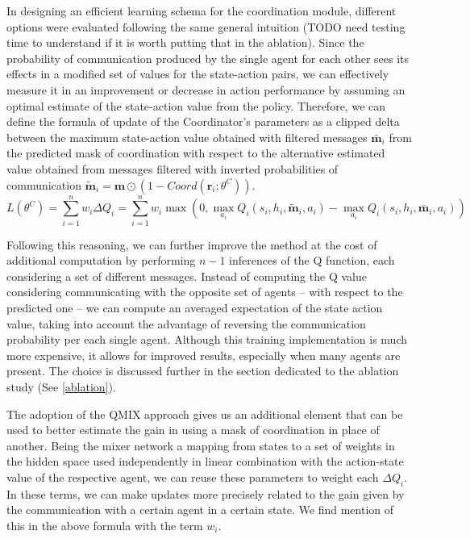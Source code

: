 \documentclass[a4paper,singleside,12pt]{report} %
\begin{document}
In designing an efficient learning schema for the coordination module, different options were evaluated following the same general intuition (TODO need testing time to understand if it is worth putting that in the ablation). Since the probability of communication produced by the single agent for each other sees its effects in a modified set of values for the state-action pairs, we can effectively measure it in an improvement or decrease in action performance by assuming an optimal estimate of the state-action value from the policy. Therefore, we can define the formula of update of the Coordinator's parameters as a clipped delta between the maximum state-action value obtained with filtered messages \(\bar{\textbf{m}}_i\) from the predicted mask of coordination with respect to the alternative estimated value obtained from messages filtered with inverted probabilities of communication
\(\tilde{\textbf{m}}_i = \textbf{m} \odot (1- Coord(\textbf{r}_i; \theta^C))\).
  \begin{equation}
    L(\theta^C)= \sum^n_{i=1} w_i \Delta Q_i = \sum^n_{i=1} w_i \max(0,\max_{a_i}Q_i(s_i,h_i,\tilde{\textbf{m}}_i,a_i) - \max_{a_i}Q_i(s_i,h_i,\bar{\textbf{m}}_i,a_i))
  \end{equation}

Following this reasoning, we can further improve the method at the cost of additional computation by performing $n-1$ inferences of the Q function, each considering a set of different messages. Instead of computing the Q value considering communicating with the opposite set of agents -- with respect to the predicted one -- we can compute an averaged expectation of the state action value, taking into account the advantage of reversing the communication probability per each single agent. Although this training implementation is much more expensive, it allows for improved results, especially when many agents are present. The choice is discussed further in the section dedicated to the ablation study (See \ref{ablation}).

The adoption of the QMIX approach gives us an additional element that can be used to better estimate the gain in using a mask of coordination in place of another. Being the mixer network a mapping from states to a set of weights in the hidden space used independently in linear combination with the action-state value of the respective agent, we can reuse these parameters to weight each \(\Delta Q_i\). In these terms, we can make updates more precisely related to the gain given by the communication with a certain agent in a certain state. We find mention of this in the above formula with the term \(w_i\).
\end{document}
